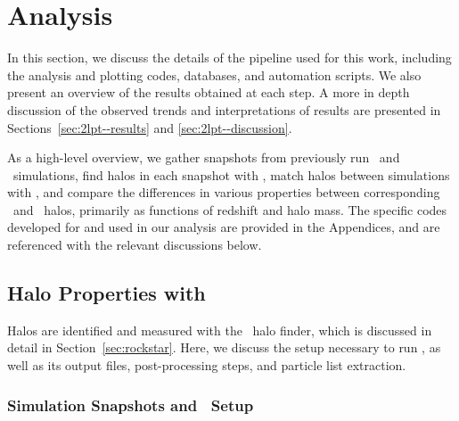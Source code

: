 
%
%

\section{Analysis}
\label{sec:analysis}



In this section, we discuss the details of the pipeline used for this work, including the analysis and plotting codes, databases, and automation scripts.  We also present an overview of the results obtained at each step.  A more in depth discussion of the observed trends and interpretations of results are presented in Sections~\ref{sec:2lpt--results} and \ref{sec:2lpt--discussion}.

As a high-level overview, we gather snapshots from previously run \lpt\ and \za\ simulations, find halos in each snapshot with \rockstar, match halos between simulations with \crossmatch, and compare the differences in various properties between corresponding \lpt\ and \za\ halos, primarily as functions of redshift and halo mass.  The specific codes developed for and used in our analysis are provided in the Appendices, and are referenced with the relevant discussions below.




\subsection{Halo Properties with \rockstar}
\label{subsec:analysis--halo_properties}


Halos are identified and measured with the \rockstar\ halo finder, which is discussed in detail in Section~\ref{sec:rockstar}.  Here, we discuss the setup necessary to run \rockstar, as well as its output files, post-processing steps, and particle list extraction.



\subsubsection{Simulation Snapshots and \rockstar\ Setup}
\label{subsubsec:analysis--halo_properties--output}


